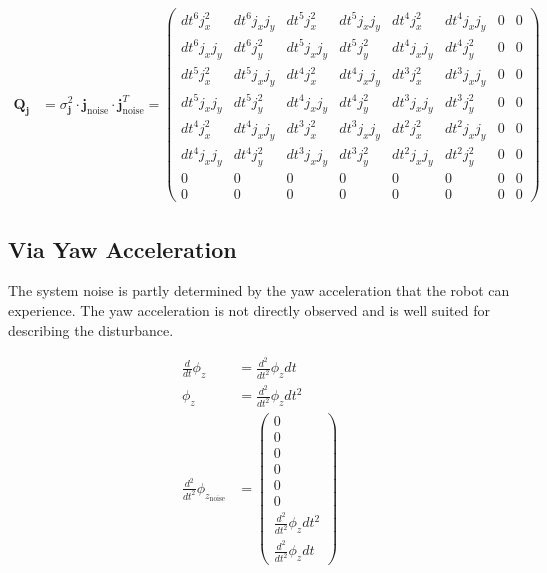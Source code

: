 \documentclass{article}
\begin{document}
\begin{align}
  \textbf{Q}_{\textbf{j}} &= \sigma^2_{\textbf{j}} \cdot \textbf{j}_{\textrm{noise}} \cdot \textbf{j}_{\textrm{noise}}^T =
  \left(\begin{matrix}dt^{6} j_{x}^{2} & dt^{6} j_{x} j_{y} & dt^{5} j_{x}^{2} & dt^{5} j_{x} j_{y} & dt^{4} j_{x}^{2} & dt^{4} j_{x} j_{y} & 0 & 0\\dt^{6} j_{x} j_{y} & dt^{6} j_{y}^{2} & dt^{5} j_{x} j_{y} & dt^{5} j_{y}^{2} & dt^{4} j_{x} j_{y} & dt^{4} j_{y}^{2} & 0 & 0\\dt^{5} j_{x}^{2} & dt^{5} j_{x} j_{y} & dt^{4} j_{x}^{2} & dt^{4} j_{x} j_{y} & dt^{3} j_{x}^{2} & dt^{3} j_{x} j_{y} & 0 & 0\\dt^{5} j_{x} j_{y} & dt^{5} j_{y}^{2} & dt^{4} j_{x} j_{y} & dt^{4} j_{y}^{2} & dt^{3} j_{x} j_{y} & dt^{3} j_{y}^{2} & 0 & 0\\dt^{4} j_{x}^{2} & dt^{4} j_{x} j_{y} & dt^{3} j_{x}^{2} & dt^{3} j_{x} j_{y} & dt^{2} j_{x}^{2} & dt^{2} j_{x} j_{y} & 0 & 0\\dt^{4} j_{x} j_{y} & dt^{4} j_{y}^{2} & dt^{3} j_{x} j_{y} & dt^{3} j_{y}^{2} & dt^{2} j_{x} j_{y} & dt^{2} j_{y}^{2} & 0 & 0\\0 & 0 & 0 & 0 & 0 & 0 & 0 & 0\\0 & 0 & 0 & 0 & 0 & 0 & 0 & 0\end{matrix}\right)
\end{align}


\subsection{Via Yaw Acceleration}

The system noise is partly determined by the yaw acceleration that the robot can experience. The yaw acceleration is not directly observed and is well suited for describing the disturbance.

\begin{align}
  \frac{d}{dt}\phi_z &= \frac{d^2}{dt^2}\phi_z dt \\
  \phi_z &= \frac{d^2}{dt^2}\phi_z dt^{2} \\
  \frac{d^2}{dt^2}\phi_{z_\textrm{noise}} &= \left(\begin{matrix}0\\0\\0\\0\\0\\0\\\frac{d^2}{dt^2}\phi_z dt^{2}\\\frac{d^2}{dt^2}\phi_z dt\end{matrix}\right) \\
\end{align}
\end{document}
